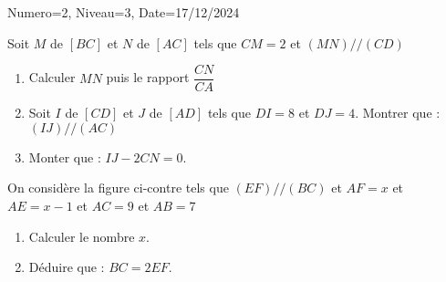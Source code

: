 \documentclass[a4paper,12pt]{article}
\begin{document}
\begin{Maquette}[DS]{Numero=2, Niveau=3, Date=17/12/2024}
\begin{exercice}
Soit $M$ de $[BC]$ et $N$ de $[AC]$ tels que $CM=2$ et $(MN)//(CD)$
\begin{enumerate}
\item Calculer $MN$ puis le rapport $\dfrac{CN}{CA}$
\item Soit $I$ de $[CD]$ et $J$ de $[AD]$ tels que $DI=8$ et $DJ=4$. Montrer que : $(IJ)//(AC)$
\item Monter que : $IJ - 2CN=0$.
\end{enumerate}
\end{exercice}

\begin{exercice}
\begin{minipage}{0.4\linewidth}
\end{minipage}
\begin{minipage}{0.6\linewidth}
On considère la figure ci-contre tels que  $(EF) // (BC)$  et  $AF=x$ et $AE=x-1$ et $AC=9$ et $AB=7$

\begin{enumerate}
\item Calculer le nombre $x$.
\item Déduire que : $BC=2EF$.
\end{enumerate}
\end{minipage}
\end{exercice}
\end{Maquette}
\end{document}
